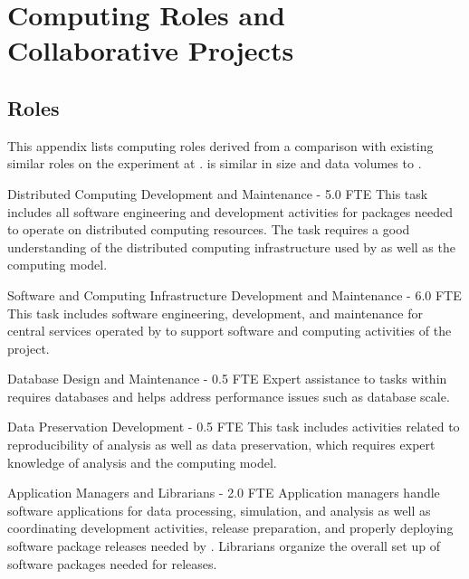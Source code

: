 

\chapter{Computing Roles and Collaborative  Projects} 
\label{appx:es-comp}

\section{Roles}
\label{appx:comp-roles}

This appendix lists  computing roles derived from a comparison with existing similar roles on the  experiment at .   is similar in size and data volumes to . 

\begin{description}


\item {Distributed Computing Development and Maintenance - 5.0 FTE}
This task includes all software engineering and development activities for packages needed to operate on distributed computing resources. The task requires a good understanding of the distributed computing infrastructure used by  as well as the  computing model.%

\item {Software and Computing Infrastructure Development and Maintenance - 6.0 FTE}
This task includes software engineering, development, and maintenance for central services operated by  to support software and computing activities of the project.   %

\item {Database Design and Maintenance - 0.5 FTE}
Expert assistance to tasks within  requires databases and helps address performance issues such as database scale. %

\item {Data Preservation Development - 0.5 FTE}
This task includes activities related to reproducibility of analysis as well as data preservation, which requires expert knowledge of analysis and the computing model. %

\item {Application Managers and Librarians - 2.0 FTE}
Application managers handle software applications for data processing, simulation, and analysis as well as coordinating development activities, release preparation, and properly deploying software package releases needed by . Librarians organize the overall set up of software packages needed for releases. %


\end{description}
